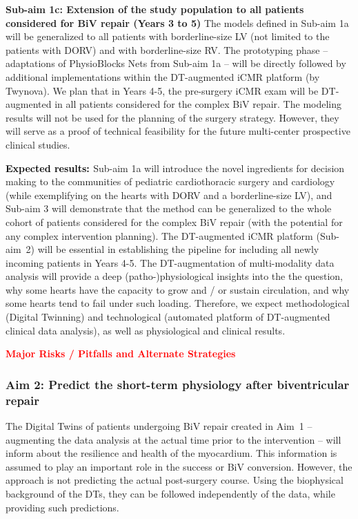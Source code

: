 \textbf{Sub-aim 1c: Extension of the study population to all patients considered for BiV repair (Years 3 to 5)}
The models defined in Sub-aim 1a will be generalized to all patients with borderline-size LV (not limited to the patients with DORV) and with borderline-size RV.  The prototyping phase -- adaptations of PhysioBlocks Nets from Sub-aim 1a -- will be directly followed by additional implementations within the DT-augmented iCMR platform (by Twynova).
We plan that in Years 4-5, the pre-surgery iCMR exam will be DT-augmented  in all patients considered for the complex BiV repair.  The modeling results will not be used for the planning of the surgery strategy. However, they will serve as a proof of technical feasibility for the future multi-center prospective clinical studies. 

\textbf{\textcolor{black}{Expected results: } }
Sub-aim 1a will introduce the novel ingredients for decision making to the communities of pediatric cardiothoracic surgery and cardiology (while exemplifying on the hearts with DORV and a borderline-size LV), and Sub-aim 3 will demonstrate that the method can be generalized to the whole cohort of patients considered for the complex BiV repair (with the potential for any complex intervention planning). The DT-augmented iCMR platform (Sub-aim~2) will be essential in establishing the pipeline for including all newly incoming patients in Years 4-5. %
The DT-augmentation of multi-modality data analysis will provide a deep (patho-)physiological insights into the the question, why some hearts have the capacity to grow and / or sustain circulation, and why some hearts tend to fail under such loading. Therefore, we expect methodological (Digital Twinning) and technological (automated platform of DT-augmented clinical data analysis), as well as physiological and clinical results.

\textbf{\textcolor{red}{Major Risks / Pitfalls and Alternate Strategies}}

\subsubsection{Aim 2: Predict the short-term physiology after biventricular repair}
The Digital Twins of patients undergoing BiV repair created in Aim~1 -- augmenting the data analysis at the actual time prior to the intervention -- will inform about the resilience and health of the myocardium. This information is assumed to play an important role in the success or BiV conversion. However, the approach is not predicting the actual post-surgery course.  Using the biophysical background of the DTs, they can be followed independently of the data, while providing such predictions.

